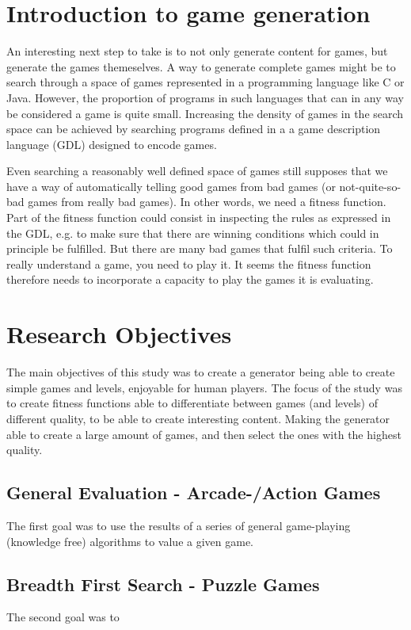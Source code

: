 \documentclass[a4paper,titlepage,final, twoside]{report}
\begin{document}
\section{Introduction to game generation}
An interesting next step to take is to not only generate content for games, but generate the games themeselves.
A way to generate complete games might be to search through a space of games represented in a programming language like C or Java. However, the proportion of programs in such languages that can in any way be considered a game is quite small. Increasing the density of games in the search space can be achieved by searching programs defined in a a game description language (GDL) designed to encode games. %

Even searching a reasonably well defined space of games still supposes that we have a way of automatically telling good games from bad games (or not-quite-so-bad games from really bad games). In other words, we need a fitness function. Part of the fitness function could consist in inspecting the rules as expressed in the GDL, e.g. to make sure that there are winning conditions which could in principle be fulfilled. But there are many bad games that fulfil such criteria. To really understand a game, you need to play it. It seems the fitness function therefore needs to incorporate a capacity to play the games it is evaluating. %

\section{Research Objectives}
The main objectives of this study was to create a generator being able to create simple games and levels, enjoyable for human players.
The focus of the study was to create fitness functions able to differentiate between games (and levels) of different quality, to be able to create interesting content. Making the generator able to create a large amount of games, and then select the ones with the highest quality.

\subsection{General Evaluation - Arcade-/Action Games}
The first goal was to use the results of a series of general game-playing (knowledge free) algorithms to value a given game.

\subsection{Breadth First Search - Puzzle Games}
The second goal was to 
\end{document}
